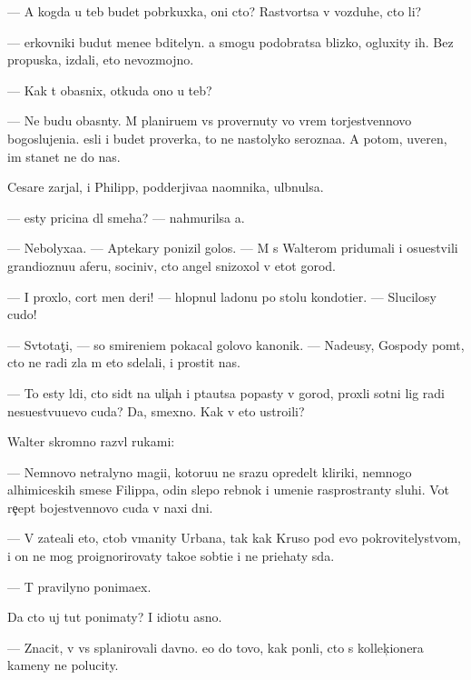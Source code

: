 \documentclass[10pt]{book}
\begin{document}
— A kogda u teb{\ia} budet pobr{\ia}kuxka, oni cto? Rastvor{\ia}tsa v vozduhe, cto li?

— {\C}erkovniki budut mene{\y}e bditelyn{\yi}. {\Y}a smogu podobratsa blizko, ogluxity ih. Bez propuska, izdali, eto nevozmojno.

— Kak t{\yi} ob{\y}asnix, otkuda ono u teb{\ia}?

— Ne budu ob{\y}asn{\ia}ty. M{\yi} planiru{\y}em vs{\e} provernuty vo vrem{\ia} torjestvennovo bogoslujeni{\y}a. {\Y}esli i budet proverka, to ne nastolyko ser{\y}ozna{\y}a. A potom, uveren, im stanet ne do nas.

Cesare zarjal, i Philipp, podderjiva{\y}a na{\y}omnika, ul{\yi}bnulsa.

— {\Y}esty pricina dl{\ia} smeha? — nahmurilsa {\y}a.

— Nebolyxa{\y}a. — Aptekary ponizil golos. — M{\yi} s Walterom pridumali i osu{\x}estvili grandioznu{\y}u aferu, sociniv, cto angel snizoxol v etot gorod.

— I proxlo, cort men{\ia} deri! — hlopnul ladon{\y}u po stolu kondotier. — Slucilosy cudo!

— Sv{\ia}totat{\c}i, — so smireni{\y}em pokacal golovo{\y} kanonik. — Nade{\y}usy, Gospody po{\y}m{\e}t, cto ne radi zla m{\yi} eto sdelali, i prostit nas.

— To {\y}esty l{\iu}di, cto sid{\ia}t na uli{\c}ah i p{\yi}ta{\y}utsa popasty v gorod, proxli sotni lig radi nesu{\x}estvu{\y}u{\x}evo cuda? Da, smexno. Kak v{\yi} eto ustro{\y}ili?

Walter skromno razv{\e}l rukami:

— Nemnovo ne{\y}tralyno{\y} magi{\y}i, kotoru{\y}u ne srazu opredel{\ia}t kliriki, nemnogo alhimiceskih smese{\y} Filippa, odin slepo{\y} reb{\e}nok i umeni{\y}e rasprostran{\ia}ty sluhi. Vot re{\c}ept bojestvennovo cuda v naxi dni.

— V{\yi} zate{\y}ali eto, ctob{\yi} v{\yi}manity Urbana, tak kak Kruso pod {\y}evo pokrovitelystvom, i on ne mog proignorirovaty tako{\y}e sob{\yi}ti{\y}e i ne pri{\y}ehaty s{\iu}da.

— T{\yi} pravilyno ponima{\y}ex.

Da cto uj tut ponimaty? I idiotu {\y}asno.

— Znacit, v{\yi} vs{\e} splanirovali davno. {\Y}e{\x}o do tovo, kak pon{\ia}li, cto s kollek{\c}ionera kameny ne polucity.
\end{document}
